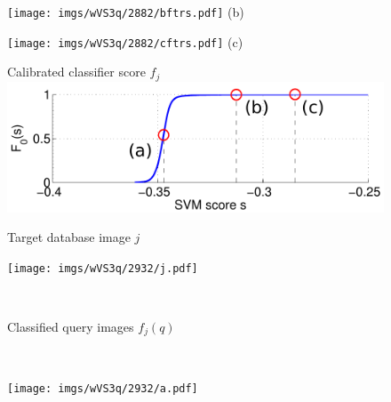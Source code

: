 \begin{figure}
\begin{minipage}{0.48\linewidth}
\begin{minipage}{\wii}
            \centering
            \texttt{[image: imgs/wVS3q/2882/bftrs.pdf]}
            \newline
            (b)
          \end{minipage}  
          \begin{minipage}{\wii}
            \centering
            \texttt{[image: imgs/wVS3q/2882/cftrs.pdf]}
            \newline
            (c)
          \end{minipage} 
    \end{minipage}%
    \begin{minipage}{0.04\linewidth}
      \hspace{\linewidth}
    \end{minipage}
    \begin{minipage}{0.48\linewidth}
          \begin{minipage}{0.66\linewidth}
            \centering
            {\scriptsize Calibrated classifier score $f_j$}
            \\
            \vspace{2mm}
            \includegraphics[width=\linewidth]{imgs/wVS3q/2932/graphBigO.pdf}
          \end{minipage} 
          \begin{minipage}{\wii}
            \centering
            \centerline{\scriptsize Target database image $j$}
            \texttt{[image: imgs/wVS3q/2932/j.pdf]}
          \end{minipage}  
          \vspace{3mm}
          \\
          \centerline{\scriptsize Classified query images $f_j(q)$} 
          \\
          \begin{minipage}{\wii}
            \centering
            \texttt{[image: imgs/wVS3q/2932/a.pdf]}
          \end{minipage}  

\end{minipage}
\end{figure}
